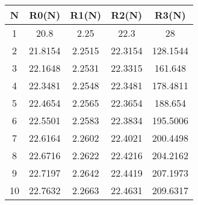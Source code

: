 \begin{tabular}{|c|c|c|c|c|}
\hline
\textbf{N}&\textbf{R0(N)}&\textbf{R1(N)}&\textbf{R2(N)}&\textbf{R3(N)}\\\hline
1&20.8&2.25&22.3&28\\\hline
2&21.8154&2.2515&22.3154&128.1544\\\hline
3&22.1648&2.2531&22.3315&161.648\\\hline
4&22.3481&2.2548&22.3481&178.4811\\\hline
5&22.4654&2.2565&22.3654&188.654\\\hline
6&22.5501&2.2583&22.3834&195.5006\\\hline
7&22.6164&2.2602&22.4021&200.4498\\\hline
8&22.6716&2.2622&22.4216&204.2162\\\hline
9&22.7197&2.2642&22.4419&207.1973\\\hline
10&22.7632&2.2663&22.4631&209.6317\\\hline
\end{tabular}
